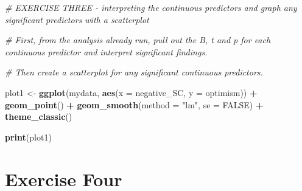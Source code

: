 \documentclass[
]{book}
\newenvironment{Shaded}{\begin{snugshade}}{\end{snugshade}}
\newcommand{\AttributeTok}[1]{\textcolor[rgb]{0.13,0.29,0.53}{#1}}
\newcommand{\CommentTok}[1]{\textcolor[rgb]{0.56,0.35,0.01}{\textit{#1}}}
\newcommand{\ConstantTok}[1]{\textcolor[rgb]{0.56,0.35,0.01}{#1}}
\newcommand{\FunctionTok}[1]{\textcolor[rgb]{0.13,0.29,0.53}{\textbf{#1}}}
\newcommand{\NormalTok}[1]{#1}
\newcommand{\OtherTok}[1]{\textcolor[rgb]{0.56,0.35,0.01}{#1}}
\newcommand{\SpecialCharTok}[1]{\textcolor[rgb]{0.81,0.36,0.00}{\textbf{#1}}}
\newcommand{\StringTok}[1]{\textcolor[rgb]{0.31,0.60,0.02}{#1}}
\let\oldsection\section
\renewcommand{\section}{\needspace{5\baselineskip}\oldsection}
\begin{document}
\begin{Shaded}
\begin{Highlighting}[]
\CommentTok{\# EXERCISE THREE {-} interpreting the continuous predictors and graph any significant predictors with a scatterplot}

\CommentTok{\# First, from the analysis already run, pull out the B, t and p for each continuous predictor and interpret significant findings.}

\CommentTok{\# Then create a scatterplot for any significant continuous predictors.}

\NormalTok{plot1 }\OtherTok{\textless{}{-}} \FunctionTok{ggplot}\NormalTok{(mydata, }\FunctionTok{aes}\NormalTok{(}\AttributeTok{x =}\NormalTok{ negative\_SC, }\AttributeTok{y =}\NormalTok{ optimism)) }\SpecialCharTok{+}
  \FunctionTok{geom\_point}\NormalTok{() }\SpecialCharTok{+}
  \FunctionTok{geom\_smooth}\NormalTok{(}\AttributeTok{method =} \StringTok{"lm"}\NormalTok{,}
              \AttributeTok{se =} \ConstantTok{FALSE}\NormalTok{) }\SpecialCharTok{+}
  \FunctionTok{theme\_classic}\NormalTok{()}

\FunctionTok{print}\NormalTok{(plot1)}
\end{Highlighting}
\end{Shaded}

\section{\texorpdfstring{\textbf{Exercise Four}}{Exercise Four}}\label{exercise-four-3}
\end{document}
